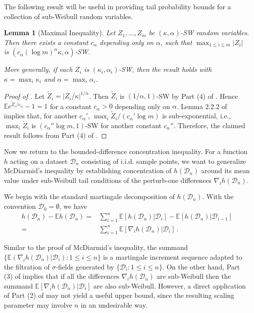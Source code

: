 \documentclass[11pt]{article}
\theoremstyle{plain}
\newtheorem{lemma}[theorem]{Lemma}
\newcommand{\D}{{\mathcal{D}}}
\begin{document}
The following result will be useful in providing tail probability bounds for a collection of sub-Weibull random variables.
\begin{lemma}
    [Maximal Inequality]
    \label{lem:2.5-sw-maximal}
    Let $Z_1,...,Z_m$ be $(\kappa,\alpha)$-SW random variables.
    Then there exists a constant $c_\alpha$ depending only on $\alpha$, such that $\max_{1\le i\le m} |Z_i|$ is  $(c_\alpha (\log m)^\alpha \kappa,\alpha)$-SW.

    More generally, if each $Z_i$ is $(\kappa_i,\alpha_i)$-SW, then the result holds with $\kappa=\max_i \kappa_i$ and $\alpha=\max_i\alpha_i$.
\end{lemma}
\begin{proof}
    [Proof of ]
    Let $\tilde Z_i=|Z_i/\kappa|^{1/\alpha}$. Then $\tilde Z_i$ is $(1/\alpha,1)$-SW by Part (4) of . Hence $\mathbb E e^{\tilde Z_i/c_\alpha}-1=1$ for a constant $c_\alpha>0$ depending only on $\alpha$.  Lemma 2.2.2 of \cite{van1996weak} implies that, for another $c_\alpha'$, $\max_i \tilde Z_i / (c_\alpha'\log m)$ is sub-exponential, i.e., $\max_i \tilde Z_i$ is $(c_\alpha''\log m,1)$-SW for another constant $c_\alpha''$. Therefore, the claimed result follows from
    Part (4) of .
\end{proof}

Now we return to the bounded-difference concentration inequality. For a function $h$ acting on a dataset $\D_n$ consisting of i.i.d. sample points, we want to generalize McDiarmid's inequality by establishing concentration of $h(\D_n)$ around its mean value under sub-Weibull tail conditions of the perturb-one differences $\nabla_i h(\D_n)$.

We begin with the standard martingale decomposition of $h(\D_n)$. 
With the convention $\D_0=\emptyset$, we have
\begin{align}
h(\D_n)- \mathbb E h(\D_n)  = & \sum_{i=1}^n \mathbb E\left[h(\D_n) |\D_{i}\right]-\mathbb E\left[h(\D_n)|\D_{i-1}\right]\nonumber\\
 =&\sum_{i=1}^n \mathbb E\left[\nabla_i h(\D_n)|\D_i\right]\,.\label{eq:2.5-nabla-telescope}
\end{align}

Similar to the proof of McDiarmid's inequality, the summand $\{\mathbb E(\nabla_i h(\D_n)|\D_i):1\le i\le n\}$ is a martingale increment sequence adapted to the filtration of $\sigma$-fields generated by $\{\D_i:1\le i\le n\}$.  On the other hand, Part (3) of  implies that if all the differences $\nabla_i h(\D_n)$ are sub-Weibull then the summand $\mathbb E[\nabla_i h(\D_n)|\D_i]$ are also sub-Weibull. However, a direct application of Part (2) of  may not yield a useful upper bound, since the resulting scaling parameter may involve $n$ in an undesirable way.
\end{document}
